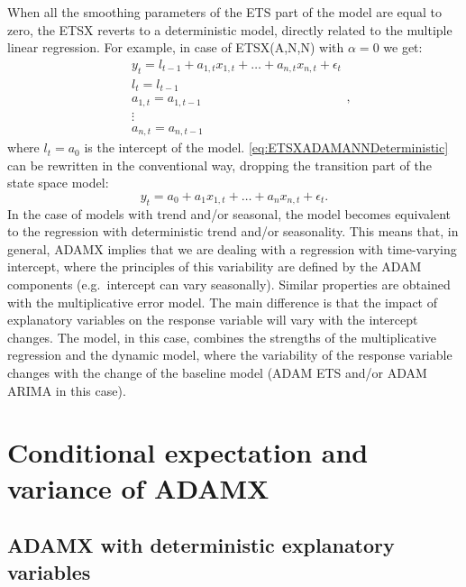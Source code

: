 \documentclass[]{book}
\theoremstyle{definition}
\theoremstyle{definition}
\theoremstyle{definition}
\theoremstyle{definition}
\theoremstyle{remark}
\begin{document}
When all the smoothing parameters of the ETS part of the model are equal to zero, the ETSX reverts to a deterministic model, directly related to the multiple linear regression. For example, in case of ETSX(A,N,N) with \(\alpha=0\) we get:
\begin{equation}
  \begin{aligned}
    & y_{t} = l_{t-1} + a_{1,t} x_{1,t} + \dots + a_{n,t} x_{n,t} + \epsilon_t \\
    & l_t = l_{t-1} \\
    & a_{1,t} = a_{1,t-1} \\
    & \vdots \\
    & a_{n,t} = a_{n,t-1}
  \end{aligned},
  \label{eq:ETSXADAMANNDeterministic}
\end{equation}
where \(l_t=a_0\) is the intercept of the model. \eqref{eq:ETSXADAMANNDeterministic} can be rewritten in the conventional way, dropping the transition part of the state space model:
\begin{equation}
    y_{t} = a_0 + a_{1} x_{1,t} + \dots + a_{n} x_{n,t} + \epsilon_t .
  \label{eq:linearRegression}
\end{equation}
In the case of models with trend and/or seasonal, the model becomes equivalent to the regression with deterministic trend and/or seasonality. This means that, in general, ADAMX implies that we are dealing with a regression with time-varying intercept, where the principles of this variability are defined by the ADAM components (e.g.~intercept can vary seasonally). Similar properties are obtained with the multiplicative error model. The main difference is that the impact of explanatory variables on the response variable will vary with the intercept changes. The model, in this case, combines the strengths of the multiplicative regression and the dynamic model, where the variability of the response variable changes with the change of the baseline model (ADAM ETS and/or ADAM ARIMA in this case).

\hypertarget{ADAMXConventionalConditionalMoments}{%
\section{Conditional expectation and variance of ADAMX}\label{ADAMXConventionalConditionalMoments}}

\hypertarget{adamx-with-deterministic-explanatory-variables}{%
\subsection{ADAMX with deterministic explanatory variables}\label{adamx-with-deterministic-explanatory-variables}}
\end{document}
